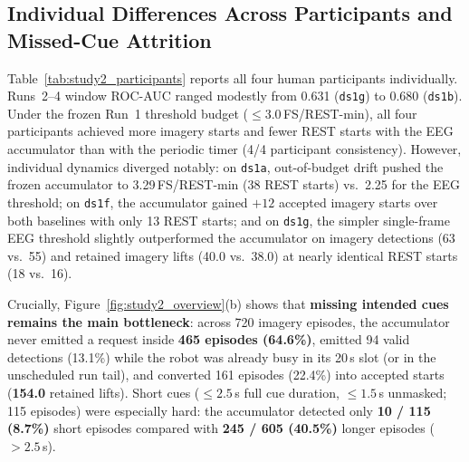 \documentclass{article}
\begin{document}
\subsection{Individual Differences Across Participants and Missed-Cue Attrition}

Table~\ref{tab:study2_participants} reports all four human participants individually. Runs~2--4 window ROC-AUC ranged modestly from 0.631 (\texttt{ds1g}) to 0.680 (\texttt{ds1b}). Under the frozen Run~1 threshold budget ($\le 3.0$\,FS/REST-min), all four participants achieved more imagery starts and fewer REST starts with the EEG accumulator than with the periodic timer (4/4 participant consistency). However, individual dynamics diverged notably: on \texttt{ds1a}, out-of-budget drift pushed the frozen accumulator to 3.29\,FS/REST-min (38 REST starts) vs.\ 2.25 for the EEG threshold; on \texttt{ds1f}, the accumulator gained $+12$ accepted imagery starts over both baselines with only 13 REST starts; and on \texttt{ds1g}, the simpler single-frame EEG threshold slightly outperformed the accumulator on imagery detections (63 vs.\ 55) and retained imagery lifts (40.0 vs.\ 38.0) at nearly identical REST starts (18 vs.\ 16).

Crucially, Figure~\ref{fig:study2_overview}(b) shows that \textbf{missing intended cues remains the main bottleneck}: across 720 imagery episodes, the accumulator never emitted a request inside \textbf{465 episodes (64.6\%)}, emitted 94 valid detections (13.1\%) while the robot was already busy in its 20\,s slot (or in the unscheduled run tail), and converted 161 episodes (22.4\%) into accepted starts (\textbf{154.0} retained lifts). Short cues ($\le 2.5$\,s full cue duration, $\le 1.5$\,s unmasked; 115 episodes) were especially hard: the accumulator detected only \textbf{10 / 115 (8.7\%)} short episodes compared with \textbf{245 / 605 (40.5\%)} longer episodes ($> 2.5$\,s).
\end{document}
